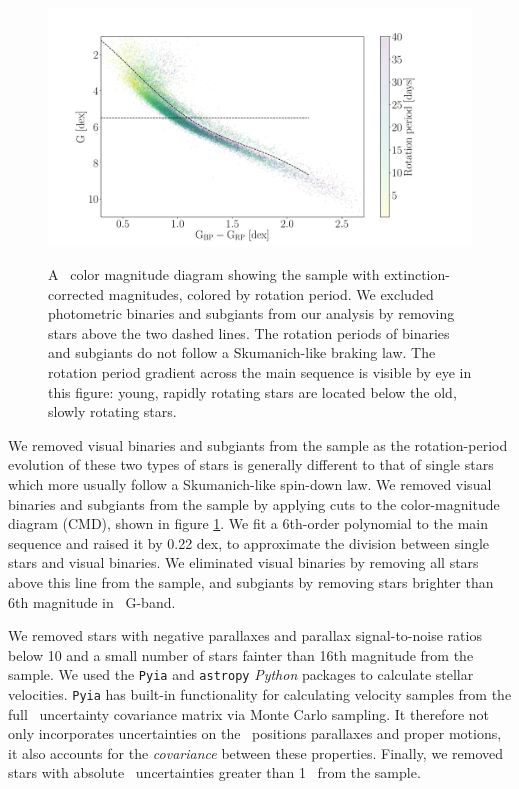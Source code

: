 \begin{figure}
  \caption{
A \gaia\ color magnitude diagram showing the \citet{mcquillan2014} sample with
    extinction-corrected magnitudes, colored by rotation period.
We excluded photometric binaries and subgiants from our analysis by removing
stars above the two dashed lines.
The rotation periods of binaries and subgiants do not follow a Skumanich-like
braking law.
The rotation period gradient across the main sequence is visible by eye in
    this figure: young, rapidly rotating stars are located below the old,
    slowly rotating stars.
}
  \centering
    \includegraphics[width=1\textwidth]{CMD_cuts}
\label{fig:CMD_cuts}
\end{figure}
We removed visual binaries and subgiants from the sample as the
rotation-period evolution of these two types of stars is generally different
to that of single stars which more usually follow a Skumanich-like spin-down
law.
We removed visual binaries and subgiants from the sample by applying cuts to
the color-magnitude diagram (CMD), shown in figure \ref{fig:CMD_cuts}.
We fit a 6th-order polynomial to the main sequence and raised it by 0.22 dex,
to approximate the division between single stars and visual binaries.
We eliminated visual binaries by removing all stars above this line from the
sample, and subgiants by removing stars brighter than 6th magnitude in \gaia\
G-band.

We removed stars with negative parallaxes and parallax signal-to-noise ratios
below 10 and a small number of stars fainter than 16th magnitude from the
sample.
We used the {\tt Pyia} \citep{price-whelan_2018} and {\tt astropy}
\citep{astropy2013, astropy2018} {\it Python} packages to calculate stellar
velocities.
{\tt Pyia} has built-in functionality for calculating velocity samples from
the full \gaia\ uncertainty covariance matrix via Monte Carlo sampling.
It therefore not only incorporates uncertainties on the \gaia\ positions
parallaxes and proper motions, it also accounts for the {\it covariance}
between these properties.
Finally, we removed stars with absolute \vb\ uncertainties greater than 1
\kms\ from the sample.

